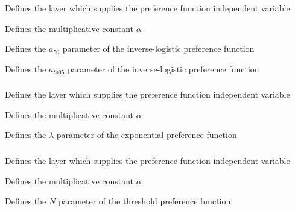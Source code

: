 \subsubsection[Inverse-logistic]{}

 {Defines the layer which supplies the preference function independent variable}

 {Defines the multiplicative constant $\alpha$}

 {Defines the $a_{50}$ parameter of the inverse-logistic preference function}

 {Defines the $a_{to95}$ parameter of the inverse-logistic preference function}

\subsubsection[Exponential]{}

 {Defines the layer which supplies the preference function independent variable}

 {Defines the multiplicative constant $\alpha$}

 {Defines the $\lambda$ parameter of the exponential preference function}

\subsubsection[Threshold]{}

 {Defines the layer which supplies the preference function independent variable}

 {Defines the multiplicative constant $\alpha$}

 {Defines the $N$ parameter of the threshold preference function}

